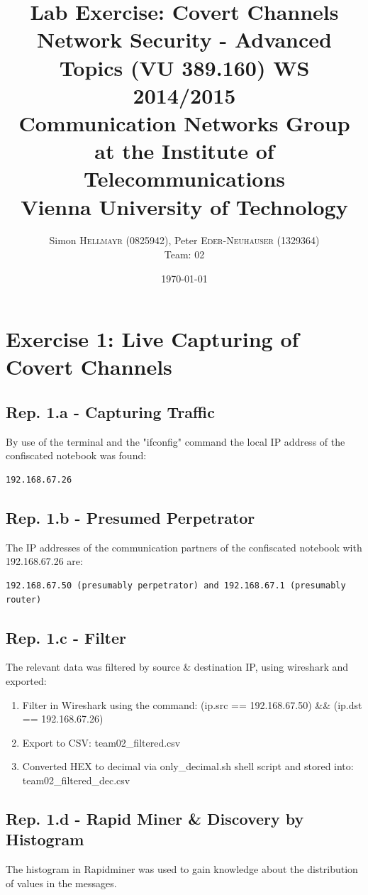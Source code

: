 \documentclass{article}
\title{\textbf{Lab Exercise: Covert Channels} \\
Network Security - Advanced Topics (VU 389.160) WS 2014/2015 \\
Communication Networks Group at the Institute of Telecommunications \\
Vienna University of Technology } %
\author{Simon \textsc{Hellmayr (0825942)}, Peter \textsc{Eder-Neuhauser (1329364)} \\[0.7cm] \LARGE Team: 02} %
\date{\today} %
\begin{document}
\maketitle %


\renewcommand{\arraystretch}{2} %
\section*{Exercise 1: Live Capturing of Covert Channels}

\subsection*{Rep. 1.a - Capturing Traffic}
By use of the terminal and the "ifconfig" command the local IP address of the confiscated notebook was found:
\begin{verbatim}
192.168.67.26
\end{verbatim}

\subsection*{Rep. 1.b - Presumed Perpetrator}
The IP addresses of the communication partners of the confiscated notebook with 192.168.67.26 are:
\begin{verbatim}
192.168.67.50 (presumably perpetrator) and 192.168.67.1 (presumably router)
\end{verbatim}

\subsection*{Rep. 1.c - Filter}
The relevant data was filtered by source \& destination IP, using wireshark and exported:
\begin{enumerate}
	\item Filter in Wireshark using the command: (ip.src == 192.168.67.50) \&\& (ip.dst == 192.168.67.26)
	\item Export to CSV: team02\_filtered.csv
	\item Converted HEX to decimal via only\_decimal.sh shell script and stored into: team02\_filtered\_dec.csv
\end{enumerate} 

\subsection*{Rep. 1.d - Rapid Miner \& Discovery by Histogram}
The histogram in Rapidminer was used to gain knowledge about the distribution of values in the messages.
\end{document}
